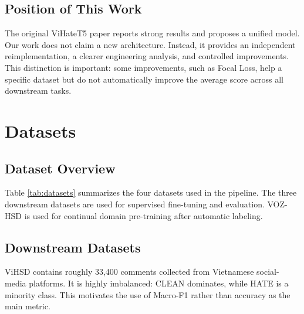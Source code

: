 \documentclass[journal]{IEEEtran}
\newcommand{\mf}{Macro-F1}
\begin{document}
\subsection{Position of This Work}
The original ViHateT5 paper reports strong results and proposes a unified model. Our work does not claim a new architecture. Instead, it provides an independent reimplementation, a clearer engineering analysis, and controlled improvements. This distinction is important: some improvements, such as Focal Loss, help a specific dataset but do not automatically improve the average score across all downstream tasks.

\section{Datasets}
\subsection{Dataset Overview}
Table \ref{tab:datasets} summarizes the four datasets used in the pipeline. The three downstream datasets are used for supervised fine-tuning and evaluation. VOZ-HSD is used for continual domain pre-training after automatic labeling.

\begin{table}[!t]
\centering
\caption{Datasets used in the project.}
\label{tab:datasets}
\end{table}

\subsection{Downstream Datasets}
ViHSD contains roughly 33,400 comments collected from Vietnamese social-media platforms. It is highly imbalanced: CLEAN dominates, while HATE is a minority class. This motivates the use of \mf{} rather than accuracy as the main metric.
\end{document}
